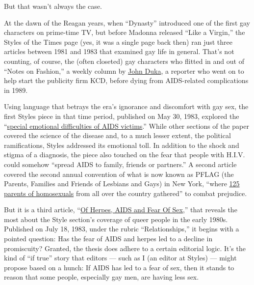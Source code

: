 But that wasn't always the case.

At the dawn of the Reagan years, when ``Dynasty'' introduced one of the
first gay characters on prime-time TV, but before Madonna released
``Like a Virgin,'' the Styles of the Times page (yes, it was a single
page back then) ran just three articles between 1981 and 1983 that
examined gay life in general. That's not counting, of course, the (often
closeted) gay characters who flitted in and out of ``Notes on Fashion,''
a weekly column by
\href{https://www.nytimes3xbfgragh.onion/1989/01/23/obituaries/john-duka-39-former-times-writer-on-fashion-and-art.html}{John
Duka}, a reporter who went on to help start the publicity firm KCD,
before dying from AIDS-related complications in 1989.

Using language that betrays the era's ignorance and discomfort with gay
sex, the first Styles piece in that time period, published on May 30,
1983, explored the
``\href{https://www.nytimes3xbfgragh.onion/1983/05/30/style/facing-the-emotional-anguish-of-aids.html}{special
emotional difficulties of AIDS victims}.'' While other sections of the
paper covered the science of the disease and, to a much lesser extent,
the political ramifications, Styles addressed its emotional toll. In
addition to the shock and stigma of a diagnosis, the piece also touched
on the fear that people with H.I.V. could somehow ``spread AIDS to
family, friends or partners.'' A second article covered the second
annual convention of what is now known as PFLAG (the Parents, Families
and Friends of Lesbians and Gays) in New York, ``where
\href{https://www.nytimes3xbfgragh.onion/1983/10/10/style/for-homosexuals-parents-srength-in-community.html}{125
parents of homosexuals} from all over the country gathered'' to combat
prejudice.

But it is a third article,
``\href{https://www.nytimes3xbfgragh.onion/1983/07/18/style/relationships-of-herpes-aids-and-fear-of-sex.html}{Of
Herpes, AIDS and Fear Of Sex},'' that reveals the most about the Style
section's coverage of queer people in the early 1980s. Published on July
18, 1983, under the rubric ``Relationships,'' it begins with a pointed
question: Has the fear of AIDS and herpes led to a decline in
promiscuity? Granted, the thesis does adhere to a certain editorial
logic. It's the kind of ``if true'' story that editors --- such as I (an
editor at Styles) --- might propose based on a hunch: If AIDS has led to
a fear of sex, then it stands to reason that some people, especially gay
men, are having less sex.

